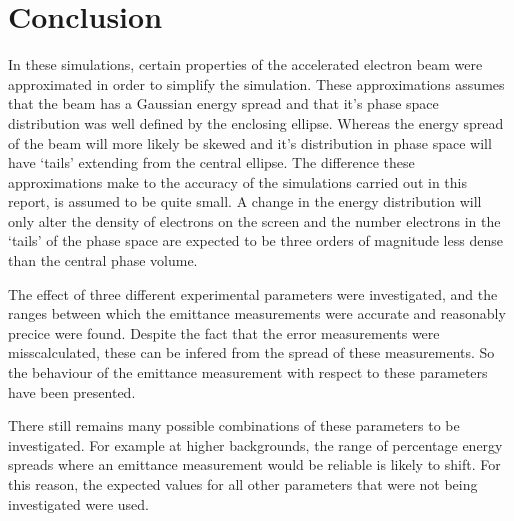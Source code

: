 
\section{Conclusion}
\label{sec:conclusion}

In these simulations, certain properties of the accelerated electron beam were
approximated in order to simplify the simulation. These approximations assumes
that the beam has a Gaussian energy spread and that it's phase space
distribution was well defined by the enclosing ellipse. Whereas the energy
spread of the beam will more likely be skewed and it's distribution in phase
space will have `tails' extending from the central ellipse. The difference these
approximations make to the accuracy of the simulations carried out in this
report, is assumed to be quite small.  A change in the energy distribution will
only alter the density of electrons on the screen and the number electrons in
the `tails' of the phase space are expected to be three orders of magnitude less
dense than the central phase volume.

The effect of three different experimental parameters were investigated, and
the ranges between which the emittance measurements were accurate and reasonably
precice were found. Despite the fact that the error measurements were
misscalculated, these can be infered from the spread of these measurements.
So the behaviour of the emittance measurement with respect to these parameters
have been presented.

There still remains many possible combinations of these parameters to be
investigated. For example at higher backgrounds, the range of percentage energy
spreads where an emittance measurement would be reliable is likely to shift. For
this reason, the expected values for all other parameters that were not being
investigated were used.
